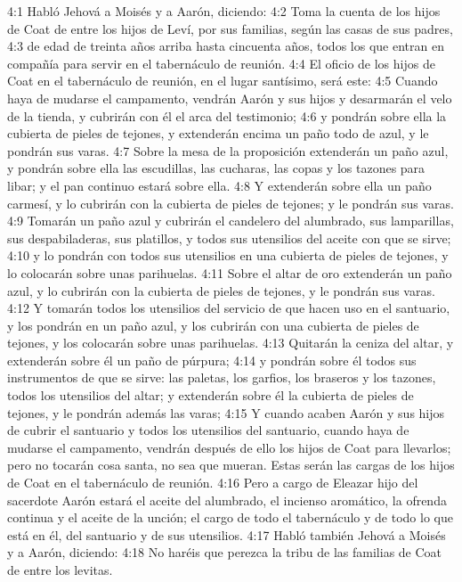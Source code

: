 4:1 Habló Jehová a Moisés y a Aarón, diciendo:  
4:2 Toma la cuenta de los hijos de Coat de entre los hijos de Leví, por sus familias, según las casas de sus padres,  
4:3 de edad de treinta años arriba hasta cincuenta años, todos los que entran en compañía para servir en el tabernáculo de reunión. 
4:4 El oficio de los hijos de Coat en el tabernáculo de reunión, en el lugar santísimo, será este:  
4:5 Cuando haya de mudarse el campamento, vendrán Aarón y sus hijos y desarmarán el velo de la tienda, y cubrirán con él el arca del testimonio;  
4:6 y pondrán sobre ella la cubierta de pieles de tejones, y extenderán encima un paño todo de azul, y le pondrán sus varas.  
4:7 Sobre la mesa de la proposición extenderán un paño azul, y pondrán sobre ella las escudillas, las cucharas, las copas y los tazones para libar; y el pan continuo estará sobre ella.  
4:8 Y extenderán sobre ella un paño carmesí, y lo cubrirán con la cubierta de pieles de tejones; y le pondrán sus varas.  
4:9 Tomarán un paño azul y cubrirán el candelero del alumbrado, sus lamparillas, sus despabiladeras, sus platillos, y todos sus utensilios del aceite con que se sirve;  
4:10 y lo pondrán con todos sus utensilios en una cubierta de pieles de tejones, y lo colocarán sobre unas parihuelas.  
4:11 Sobre el altar de oro extenderán un paño azul, y lo cubrirán con la cubierta de pieles de tejones, y le pondrán sus varas.  
4:12 Y tomarán todos los utensilios del servicio de que hacen uso en el santuario, y los pondrán en un paño azul, y los cubrirán con una cubierta de pieles de tejones, y los colocarán sobre unas parihuelas.  
4:13 Quitarán la ceniza del altar, y extenderán sobre él un paño de púrpura;  
4:14 y pondrán sobre él todos sus instrumentos de que se sirve: las paletas, los garfios, los braseros y los tazones, todos los utensilios del altar; y extenderán sobre él la cubierta de pieles de tejones, y le pondrán además las varas;  
4:15 Y cuando acaben Aarón y sus hijos de cubrir el santuario y todos los utensilios del santuario, cuando haya de mudarse el campamento, vendrán después de ello los hijos de Coat para llevarlos; pero no tocarán cosa santa, no sea que mueran. Estas serán las cargas de los hijos de Coat en el tabernáculo de reunión.  
4:16 Pero a cargo de Eleazar hijo del sacerdote Aarón estará el aceite del alumbrado, el incienso aromático, la ofrenda continua y el aceite de la unción; el cargo de todo el tabernáculo y de todo lo que está en él, del santuario y de sus utensilios.  
4:17 Habló también Jehová a Moisés y a Aarón, diciendo:  
4:18 No haréis que perezca la tribu de las familias de Coat de entre los levitas. 
